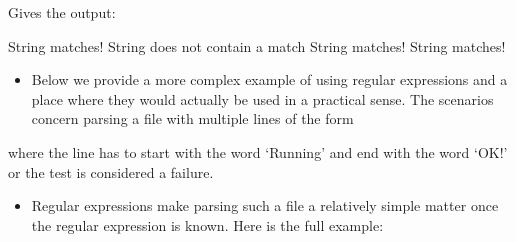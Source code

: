 \documentclass[letterpaper,10pt,english,openany]{sphinxmanual}
\begin{document}
Gives the output:

\begin{sphinxVerbatim}[commandchars=\\\{\}]
String matches!
String does not contain a match
String matches!
String matches!
\end{sphinxVerbatim}
\begin{itemize}
\item {} 
Below we provide a more complex example of using regular expressions
and a place where they would actually be used in a practical sense.
The scenarios concern parsing a file with multiple lines of the form

\end{itemize}


where the line has to start with the word ‘Running’ and end with the
word ‘OK!’ or the test is considered a failure.
\begin{itemize}
\item {} 
Regular expressions make parsing such a file a relatively simple
matter once the regular expression is known. Here is the full
example:

\end{itemize}
\end{document}
